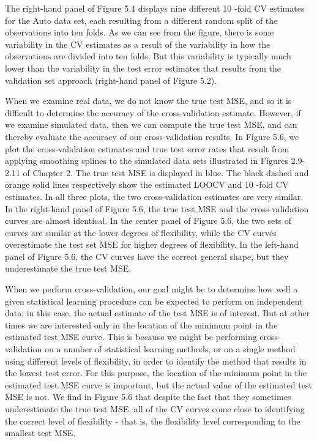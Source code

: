 \documentclass[10pt]{article}
\begin{document}
The right-hand panel of Figure 5.4 displays nine different 10 -fold CV estimates for the Auto data set, each resulting from a different random split of the observations into ten folds. As we can see from the figure, there is some variability in the CV estimates as a result of the variability in how the observations are divided into ten folds. But this variability is typically much lower than the variability in the test error estimates that results from the validation set approach (right-hand panel of Figure 5.2).

When we examine real data, we do not know the true test MSE, and so it is difficult to determine the accuracy of the cross-validation estimate. However, if we examine simulated data, then we can compute the true test MSE, and can thereby evaluate the accuracy of our cross-validation results. In Figure 5.6, we plot the cross-validation estimates and true test error rates that result from applying smoothing splines to the simulated data sets illustrated in Figures 2.9-2.11 of Chapter 2. The true test MSE is displayed in blue. The black dashed and orange solid lines respectively show the estimated LOOCV and 10 -fold CV estimates. In all three plots, the two cross-validation estimates are very similar. In the right-hand panel of Figure 5.6, the true test MSE and the cross-validation curves are almost identical. In the center panel of Figure 5.6, the two sets of curves are similar at the lower degrees of flexibility, while the CV curves overestimate the test set MSE for higher degrees of flexibility. In the left-hand panel of Figure 5.6, the CV curves have the correct general shape, but they underestimate the true test MSE.


When we perform cross-validation, our goal might be to determine how well a given statistical learning procedure can be expected to perform on independent data; in this case, the actual estimate of the test MSE is of interest. But at other times we are interested only in the location of the minimum point in the estimated test MSE curve. This is because we might be performing cross-validation on a number of statistical learning methods, or on a single method using different levels of flexibility, in order to identify the method that results in the lowest test error. For this purpose, the location of the minimum point in the estimated test MSE curve is important, but the actual value of the estimated test MSE is not. We find in Figure 5.6 that despite the fact that they sometimes underestimate the true test MSE, all of the CV curves come close to identifying the correct level of flexibility - that is, the flexibility level corresponding to the smallest test MSE.
\end{document}

